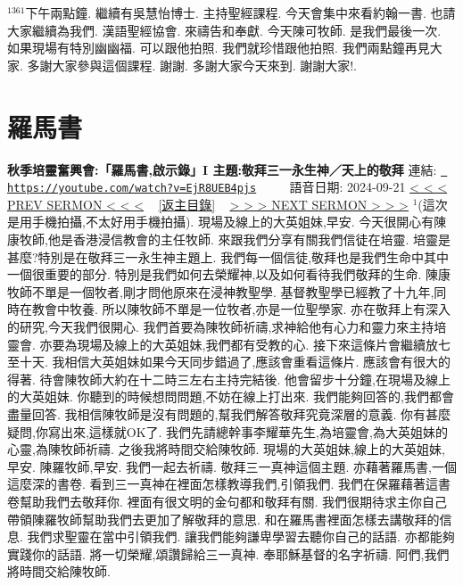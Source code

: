 \documentclass{book}
\begin{document}
$^{1361}$下午兩點鐘.
繼續有吳慧怡博士.
主持聖經課程.
今天會集中來看約翰一書.
也請大家繼續為我們.
漢語聖經協會.
來禱告和奉獻.
今天陳可牧師.
是我們最後一次.
如果現場有特別幽幽福.
可以跟他拍照.
我們就珍惜跟他拍照.
我們兩點鐘再見大家.
多謝大家參與這個課程.
謝謝.
多謝大家今天來到.
謝謝大家!.
\newpage



\section{羅馬書}
\label{sec:EjR8UEB4pjs}
\textbf{秋季培靈奮興會:「羅馬書,啟示錄」I 主題:敬拜三一永生神／天上的敬拜}
\newline
\newline
連結: \href{https://youtube.com/watch?v=EjR8UEB4pjs}{\texttt{ https://youtube.com/watch?v=EjR8UEB4pjs}} ~~~~ 語音日期: 2024-09-21 
\newline
\newline
\hyperref[sec:uvYtXSSsYt0]{\small{< < < PREV SERMON < < <}}
~
\hyperref[sec:index]{\small{[返主目錄]}}
~
\hyperref[sec:ltLox1aivp8]{\small{> > > NEXT SERMON > > >}}
\newline
\newline
$^{1}$(這次是用手機拍攝,不太好用手機拍攝).
現場及線上的大英姐妹,早安.
今天很開心有陳康牧師,他是香港浸信教會的主任牧師.
來跟我們分享有關我們信徒在培靈.
培靈是甚麼?特別是在敬拜三一永生神主題上.
我們每一個信徒,敬拜也是我們生命中其中一個很重要的部分.
特別是我們如何去榮耀神,以及如何看待我們敬拜的生命.
陳康牧師不單是一個牧者,剛才問他原來在浸神教聖學.
基督教聖學已經教了十九年,同時在教會中牧養.
所以陳牧師不單是一位牧者,亦是一位聖學家.
亦在敬拜上有深入的研究,今天我們很開心.
我們首要為陳牧師祈禱,求神給他有心力和靈力來主持培靈會.
亦要為現場及線上的大英姐妹,我們都有受教的心.
接下來這條片會繼續放七至十天.
我相信大英姐妹如果今天同步錯過了,應該會重看這條片.
應該會有很大的得著.
待會陳牧師大約在十二時三左右主持完結後.
他會留步十分鐘,在現場及線上的大英姐妹.
你聽到的時候想問問題,不妨在線上打出來.
我們能夠回答的,我們都會盡量回答.
我相信陳牧師是沒有問題的,幫我們解答敬拜究竟深層的意義.
你有甚麼疑問,你寫出來,這樣就OK了.
我們先請總幹事李耀華先生,為培靈會,為大英姐妹的心靈,為陳牧師祈禱.
之後我將時間交給陳牧師.
現場的大英姐妹,線上的大英姐妹,早安.
陳羅牧師,早安.
我們一起去祈禱.
敬拜三一真神這個主題.
亦藉著羅馬書,一個這麼深的書卷.
看到三一真神在裡面怎樣教導我們,引領我們.
我們在保羅藉著這書卷幫助我們去敬拜你.
裡面有很文明的金句都和敬拜有關.
我們很期待求主你自己帶領陳羅牧師幫助我們去更加了解敬拜的意思.
和在羅馬書裡面怎樣去講敬拜的信息.
我們求聖靈在當中引領我們.
讓我們能夠謙卑學習去聽你自己的話語.
亦都能夠實踐你的話語.
將一切榮耀,頌讚歸給三一真神.
奉耶穌基督的名字祈禱.
阿們,我們將時間交給陳牧師.
\end{document}

